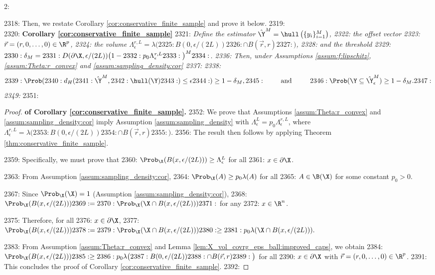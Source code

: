 2: \documentclass[12pt]{l4dc2022} %
\begin{document}
2318: Then, we restate Corollary  \ref{cor:conservative_finite_sample} and prove it below. 
2319: \\[2mm]
2320: \textbf{Corollary \ref{cor:conservative_finite_sample}} 
2321: \textit{Define the estimator $\hat\Y^M=\hull\left(\{y_i\}_{i{=}1}^M\right)$, 
2322:  the offset vector 
2323:  $\vec{r}=(r,0,\dots,0)\in\R^p$, 
2324:  the volume $\Lambda_{\epsilon}^{r,L}=\lambda\big(
2325:  B(0,\epsilon/(2L)) 
2326:  \cap B(\vec{r},r)
2327:  \big)$, 
2328:  and the threshold
2329:  $
2330:  \delta_M= 
2331:  D(\partial\X,\epsilon/(2L))\big(1 -
2332:  	p_0 \Lambda_{\epsilon}^{r,L}
2333:  \big)^M
2334:  $.
2336: Then, under Assumptions \ref{assum:f:lipschitz},  \ref{assum:Theta:r_convex} and \ref{assum:sampling_density:cor} 
2337:   
2338: $$
2339: \Prob(
2340: d_H(
2341: \hat\Y^M, 
2342: \hull(\Y)
2343: )\leq \epsilon
2344: )\geq 1-\delta_M,
2345: \qquad \text{ and }\qquad\ 
2346: \Prob(\Y\subseteq\hat\Y_\epsilon^M)\geq 1-\delta_M.
2347: $$
2349: }
2351: \begin{proof}\textbf{of Corollary \ref{cor:conservative_finite_sample}.}
2352: We prove that Assumptions \ref{assum:Theta:r_convex} and \ref{assum:sampling_density:cor} imply Assumption \ref{assum:sampling_density} with $\Lambda_{\epsilon}^{L}=p_0\Lambda_{\epsilon}^{r,L}$, where $\Lambda_{\epsilon}^{r,L}=\lambda\big(
2353:  B(0,\epsilon/(2L)) 
2354:  \cap B(\vec{r},r)
2355:  \big)$. 
2356: The result then follows by applying Theorem \ref{thm:conservative_finite_sample}.

2359: Specifically, we must prove that 
2360: $\Prob_\X(B(x,\epsilon/(2L)))\geq \Lambda_{\epsilon}^{L}$ for all  
2361: 	$x\in\partial\X$. 

2363: 	From Assumption \ref{assum:sampling_density:cor}, 
2364: 	$\Prob_\X(A)\geq p_0\lambda(A)$ for all  
2365:  	$A\in\B(\X)$ for some constant $p_0>0$.

2367: Since $\Prob_\X(\X)=1$ (Assumption \ref{assum:sampling_density:cor}), 
2368: 	$\Prob_\X(B(x,\epsilon/(2L)))
2369: 	=
2370: 	\Prob_\X(\X\cap B(x,\epsilon/(2L)))
2371: 	$ for any  
2372: 	$x\in\R^n$.

2375: 	Therefore, for all  
2376: 	$x\in\partial\X$, 
2377: 	$\Prob_\X(B(x,\epsilon/(2L)))
2378: 	=
2379: 	\Prob_\X(\X\cap B(x,\epsilon/(2L)))
2380: 	\geq 
2381: 	p_0 \lambda(\X\cap B(x,\epsilon/(2L))).$

2383: 	From Assumption \ref{assum:Theta:r_convex} and Lemma \ref{lem:X_vol_covrg_eps_ball:improved_caps}, we obtain  
2384: 	$\Prob_\X(B(x,\epsilon/(2L)))
2385: 	\geq 
2386: 	p_0 \lambda\big(
2387: B(0,\epsilon/(2L)) 
2388: \cap B(\vec{r},r)
2389: \big)$  for all  
2390: 	$x\in\partial\X$ with $\vec{r}=(r,0,\dots,0)\in\R^p$. 
2391: 	This concludes the proof of Corollary \ref{cor:conservative_finite_sample}.
2392: \end{proof}
\end{document}

